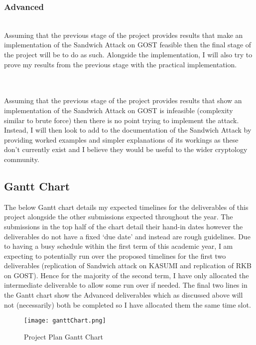 \documentclass{article}
\begin{document}
\subsubsection{Advanced}
\\
Assuming that the previous stage of the project provides results that make an implementation of the Sandwich Attack on GOST feasible then the final stage of the project will be to do as such. Alongside the implementation, I will also try to prove my results from the previous stage with the practical implementation.\\\\
\\
Assuming that the previous stage of the project provides results that show an implementation of the Sandwich Attack on GOST is infeasible (complexity similar to brute force) then there is no point trying to implement the attack. Instead, I will then look to add to the documentation of the Sandwich Attack by providing worked examples and simpler explanations of its workings as these don’t currently exist and I believe they would be useful to the wider cryptology community.  
\subsection{Gantt Chart}
The below Gantt chart details my expected timelines for the deliverables of this project alongside the other submissions expected throughout the year. The submissions in the top half of the chart detail their hand-in dates however the deliverables do not have a fixed ‘due date’ and instead are rough guidelines. 
Due to having a busy schedule within the first term of this academic year, I am expecting to potentially run over the proposed timelines for the first two deliverables (replication of Sandwich attack on KASUMI and replication of RKB on GOST). Hence for the majority of the second term, I have only allocated the intermediate deliverable to allow some run over if needed. The final two lines in the Gantt chart show the Advanced deliverables which as discussed above will not (necessarily) both be completed so I have allocated them the same time slot.



\begin{figure}[hbt!]
    \centering
    \texttt{[image: ganttChart.png]}
    \caption{Project Plan Gantt Chart}
    \label{fig:enter-label}
\end{figure}



\end{document}
